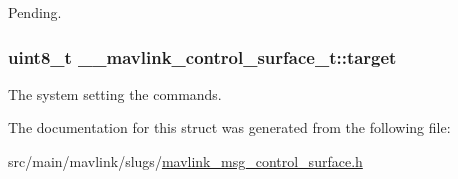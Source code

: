Pending. 

\hypertarget{struct____mavlink__control__surface__t_a1b15ea35cc5a3c18b6dbcb75816b06f8}{
\subsubsection[{target}]{\setlength{\rightskip}{0pt plus 5cm}uint8\+\_\+t \+\_\+\+\_\+mavlink\+\_\+control\+\_\+surface\+\_\+t\+::target}}\label{struct____mavlink__control__surface__t_a1b15ea35cc5a3c18b6dbcb75816b06f8}


The system setting the commands. 



The documentation for this struct was generated from the following file\+:\begin{DoxyCompactItemize}
\item 
src/main/mavlink/slugs/\hyperlink{mavlink__msg__control__surface_8h}{mavlink\+\_\+msg\+\_\+control\+\_\+surface.\+h}\end{DoxyCompactItemize}
